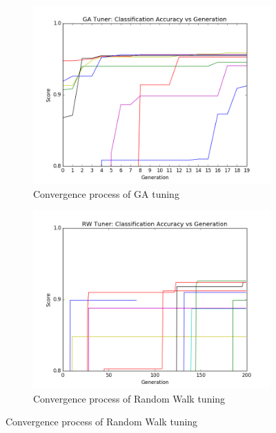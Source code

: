 \begin{figure}[H]
	\centering
	\begin{subfigure}[b]{0.45\linewidth}
		\includegraphics[width=\linewidth]{sections/imgs/ga/summary.png}
		\caption{Convergence process of GA tuning}
		\label{fig:ga_tuning_summary}
	\end{subfigure}
	\begin{subfigure}[b]{0.45\linewidth}
		\includegraphics[width=\linewidth]{sections/imgs/random_walk/summary.png}
		\caption{Convergence process of Random Walk tuning}
		\label{fig:rw_tuning_summary}
	\end{subfigure}
	

\end{figure}

